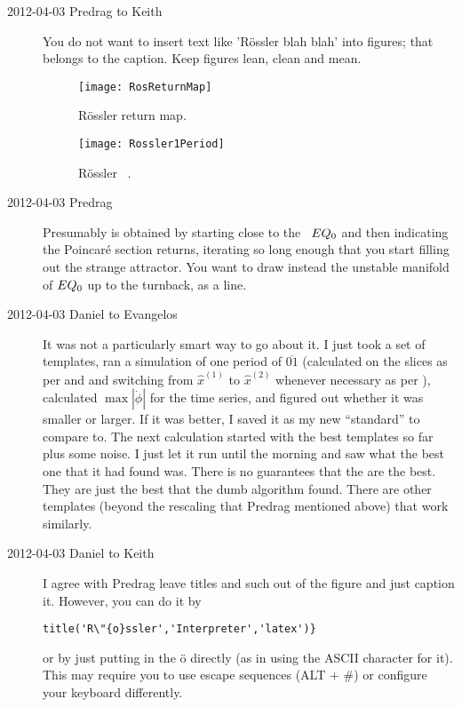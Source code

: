 \begin{description}
\item[2012-04-03 Predrag to Keith] You do not want to insert text like
'R\"ossler blah blah' into figures; that belongs to the caption. Keep
figures lean, clean and mean.

\begin{figure}
\begin{center}
\texttt{[image: RosReturnMap]}
\end{center}
  \caption{
  R\"ossler return map.
  }
\label{fig:RosRetMap}
\end{figure}

\begin{figure}
\begin{center}
\texttt{[image: Rossler1Period]}
\end{center}
  \caption{
R\"ossler \po\ .
  }
\label{fig:Ros1Per}
\end{figure}

\item[2012-04-03 Predrag] Presumably  is obtained
by starting close to the \eqv\ $EQ_{0}$ and then indicating the
Poincar\'e section returns, iterating so long enough that you start
filling out the strange attractor. You want to draw instead the unstable
manifold of $EQ_{0}$ up to the turnback, as a line.

\item[2012-04-03 Daniel to Evangelos]
It was not a particularly smart way to go about it. I just took a set of
templates, ran a simulation of one period of $\overline{01}$ (calculated
on the slices as per  and   and
switching from $\hat{x}^{(1)}$ to $\hat{x}^{(2)}$ whenever necessary as
per ), calculated $\max |\dot{\phi}|$ for the time
series, and figured out whether it was smaller or larger. If it was
better, I saved it as my new ``standard'' to compare to. The next
calculation started with the best templates so far plus some noise. I
just let it run until the morning and saw what the best one that it had
found was. There is no guarantees that the are the best. They are just
the best that the dumb algorithm found. There are other templates (beyond
the rescaling that Predrag mentioned above) that work similarly.

\item[2012-04-03 Daniel to Keith] I agree with Predrag leave titles and
such out of the figure and just caption it. However, you can do it by
\begin{verbatim}
title('R\"{o}ssler','Interpreter','latex')}
\end{verbatim}
or by just putting in the \"o directly (as in using the
ASCII character for it). This may require you to use escape sequences
(ALT + \#) or configure your keyboard differently.


\end{description}

